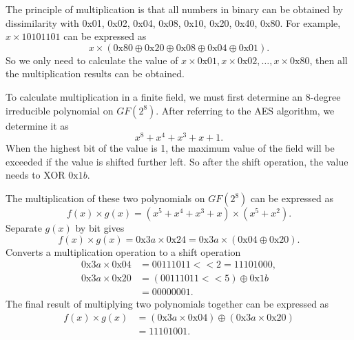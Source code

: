 The principle of multiplication is that all numbers in binary can be obtained by dissimilarity with  0x01, 0x02, 0x04, 0x08, 0x10, 0x20, 0x40, 0x80\cite{article12}. For example, $x\times 10101101$ can be expressed as
\begin{equation}
x \times(0\mathrm{x} 80 \oplus0\mathrm{x} 20\oplus0\mathrm{x} 08\oplus0\mathrm{x} 04\oplus0\mathrm{x} 01).
\end{equation}
So we only need to calculate the value of $x\times0\mathrm{x}01,x\times 0\mathrm{x}02,\dots,x\times0\mathrm{x}80$, then all the multiplication results can be obtained.

To calculate multiplication in a finite field, we must first determine an 8-degree irreducible polynomial on $GF (2^{8})$. After referring to the AES algorithm, we determine it as
\begin{equation}
x^{8}+ x^{4}+ x^{3}+ x + 1.
\end{equation}
When the highest bit of the value is 1, the maximum value of the field will be exceeded if the value is shifted further left. So after the shift operation, the value needs to XOR $0\mathrm{x}1 b$.

The multiplication of these two polynomials on $GF (2^{8})$ can be expressed as
\begin{equation}\label{eq1}
f(x) \times g(x)=\left(x^{5}+x^{4}+x^{3}+x\right) \times\left(x^{5}+x^{2}\right).
\end{equation}Separate $g(x)$ by bit gives
\begin{equation}\label{eq1}
f(x) \times g(x)=0 \mathrm{x}  3 a \times 0 \mathrm{x}  24=0 \mathrm{x}  3 a \times(0 \mathrm{x}  04 \oplus 0 \mathrm{x}  20).
\end{equation}Converts a multiplication operation to a shift operation
\begin{equation}\label{eq1}
\begin{aligned}
0 \mathrm{x} 3 a \times 0 \mathrm{x} 04 & =00111011<<2=11101000, \\
0 \mathrm{x} 3 a \times 0 \mathrm{x} 20 & =(00111011<<5) \oplus 0 \mathrm{x} 1 b \\
& =00000001.
\end{aligned}
\end{equation}The final result of multiplying two polynomials together can be expressed as
{\color{red}
\begin{equation}\label{eq1}
\begin{aligned}
f(x) \times g(x) & =(0 \mathrm{x} 3 a \times 0 \mathrm{x} 04)\oplus (0 \mathrm{x} 3 a \times 0 \mathrm{x} 20) \\
& =11101001.
\end{aligned}
\end{equation}
}
